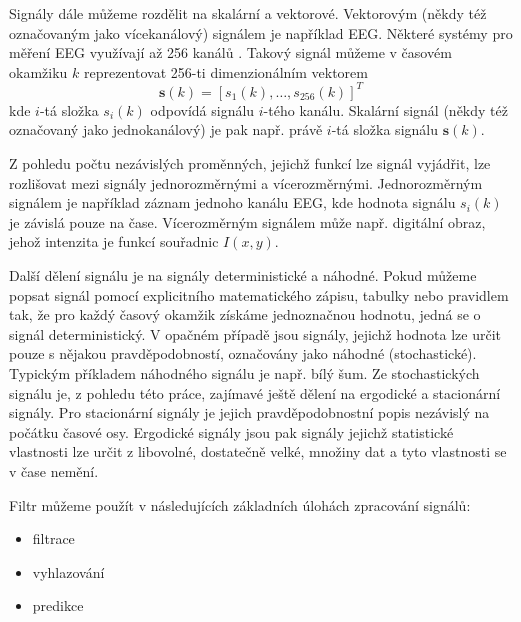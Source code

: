 \par
Signály dále můžeme rozdělit na skalární a vektorové. Vektorovým (někdy též označovaným jako vícekanálový) signálem je například EEG. Některé systémy pro měření EEG využívají až 256 kanálů \cite{eeg}. Takový signál můžeme v časovém okamžiku $k$ reprezentovat 256-ti dimenzionálním vektorem
\begin{equation}
    \textbf{s}(k)=[s_1(k),\dots,s_{256}(k)]^T
\end{equation}
kde $i$-tá složka $s_i(k)$ odpovídá signálu $i$-tého kanálu. Skalární signál (někdy též označovaný jako jednokanálový) je pak např. právě $i$-tá složka signálu $\textbf{s}(k)$.
\par 
Z pohledu počtu nezávislých proměnných, jejichž funkcí lze signál vyjádřit, lze rozlišovat mezi signály jednorozměrnými a vícerozměrnými. Jednorozměrným signálem je například záznam jednoho kanálu EEG, kde hodnota signálu $s_i(k)$ je závislá pouze na čase. Vícerozměrným signálem může např. digitální obraz, jehož intenzita je funkcí souřadnic $I(x,y)$.
\par
Další dělení signálu je na signály deterministické a náhodné. Pokud můžeme popsat signál pomocí explicitního matematického zápisu, tabulky nebo pravidlem tak, že pro každý časový okamžik získáme jednoznačnou hodnotu, jedná se o signál deterministický. V opačném případě jsou signály, jejichž hodnota lze určit pouze s nějakou pravděpodobností, označovány jako náhodné (stochastické). Typickým příkladem náhodného signálu je např. bílý šum. Ze stochastických signálu je, z pohledu této práce,  zajímavé ještě dělení na ergodické a stacionární signály. Pro stacionární signály je jejich pravděpodobnostní popis nezávislý na počátku časové osy. Ergodické signály jsou pak signály jejichž statistické vlastnosti lze určit z libovolné, dostatečně velké, množiny dat a tyto vlastnosti se v čase nemění.
\par
Filtr můžeme použít v  následujících základních úlohách zpracování signálů:
\begin{itemize}
    \item filtrace
    \item vyhlazování
    \item predikce
\end{itemize}


